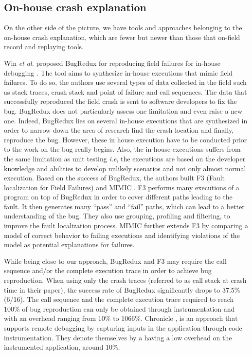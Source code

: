\documentclass[times]{smrauth}
\begin{document}
 

\subsection{On-house crash explanation}

On the other side of the picture, we have tools and approaches belonging to the on-house crash explanation, which are fewer but newer than those that on-field record and replaying tools.

Win {\it et al.} proposed BugRedux for reproducing field failures for in-house debugging \cite{Jin2012}.
The tool aims to synthesize in-house executions that mimic field failures. 
To do so, the authors use several types of data collected in the field such as stack traces, crash stack and point of failure and call sequences. 
The data that successfully reproduced the field crash is sent to software developers to fix the bug. 
BugRedux does not particularly assess one limitation and even raise a new one. 
Indeed, BugRedux lies on several in-house executions that are synthesized in order to narrow down the area of research find the crash location and finally, reproduce the bug. 
However, these in house execution have to be conducted prior to the work on the bug really begins. 
Also, the in-house executions suffers from the same limitation as unit testing {\it i.e}, the executions are based on the developer knowledge and abilities to develop unlikely scenarios and not only almost normal execution. 
Based on the success of BugRedux, the authors built F3 (Fault
localization for Field Failures) \cite{Jin2013} and MIMIC \cite{Zuddas2014}. F3 performs many
executions of a program on top of BugRedux in order to cover
different paths leading to the fault.
 It then generates many
``pass'' and ``fail'' paths, which can lead to a better understanding
of the bug. They also use grouping, profiling and filtering, to
improve the fault localization process. MIMIC further extends F3 by comparing a model of correct behavior to failing executions and identifying violations of the model as potential explanations for
failures.

While being close to our approach, BugRedux and F3 may require the call sequence and/or the complete execution trace in order to achieve bug reproduction. When using only the crash traces (referred to as call stack at crash time in their paper), the success rate of BugRedux significantly drops to 37.5\% (6/16). The call sequence and the complete execution trace required to reach 100\% of bug reproduction can only be obtained through instrumentation and with an overhead ranging from 10\% to 1066\%. Chronicle \cite{Bell2013}, is an approach that supports remote debugging by capturing inputs in the application through code instrumentation. 
They denote themselves by a having a low overhead on the instrumented application, around 10\%.
\end{document}
